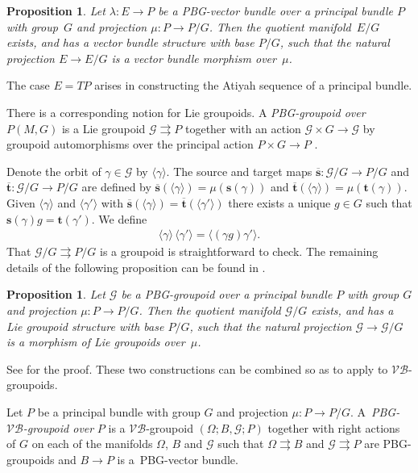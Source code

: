 \documentclass[pdftex]{sigma}
\newcommand{\Ss}{\textbf{s}}
\newcommand{\Tt}{\textbf{t}}
\renewcommand{\to}{\rightarrow}
\newcommand{\gold}{\mscr{G}}
\newcommand{\mscr}[1]{\mathscr{#1}}
\newcommand{\gpd}{\rightrightarrows}
\newcommand{\Om}{\Omega}
\renewcommand{\Bar}[1]{\overline{#1}}
\newcommand{\baralpha}{\Bar{\Ss}}
\newcommand{\barbeta}{\Bar{\Tt}}
\numberwithin{equation}{section}
\newtheorem{Proposition}[Theorem]{Proposition}
 { \theoremstyle{definition}
\newtheorem{Definition}[Theorem]{Definition}
\newtheorem{Example}[Theorem]{Example}
\newtheorem{Remark}[Theorem]{Remark} }
\begin{document}
\begin{Proposition}\label{prop:pbgvb}
Let $\lambda\colon E\to P$ be a PBG-vector bundle over a principal bundle $P$ with group~$G$ and projection $\mu\colon P\to P/G$. Then the quotient manifold~$E/G$ exists, and has a vector bundle structure with base $P/G$, such that the natural projection $E\to E/G$ is a vector bundle morphism over~$\mu$.
\end{Proposition}

The case $E = TP$ arises in constructing the Atiyah sequence of a principal bundle.

There is a corresponding notion for Lie groupoids. A \emph{PBG-groupoid over $P(M,G)$} is a Lie groupoid $\gold\gpd P$ together with an action $\gold\times G\to \gold$ by groupoid automorphisms over the principal action $P\times G\to P$ \cite[ Def\/inition~2.5.4]{Mackenzie:GT}.

Denote the orbit of $\gamma\in \gold$ by $\langle \gamma\rangle$. The source and target maps $\baralpha\colon \gold/G\to P/G$ and $\barbeta\colon \gold/G\to P/G$ are def\/ined by $\baralpha(\langle \gamma\rangle) = \mu(\Ss(\gamma))$ and $\barbeta(\langle \gamma\rangle) = \mu(\Tt(\gamma))$. Given $\langle \gamma\rangle$ and $\langle \gamma'\rangle$ with $\baralpha(\langle \gamma\rangle) = \barbeta(\langle\gamma'\rangle)$ there exists a unique $g\in G$ such that $\Ss(\gamma)g = \Tt(\gamma')$. We def\/ine
\begin{gather*}
\langle \gamma\rangle\,\langle \gamma'\rangle = \langle (\gamma g)\gamma'\rangle.
\end{gather*}
That $\gold/G\gpd P/G$ is a groupoid is straightforward to check. The remaining details of the following proposition can be found in \cite[Section~3.1]{Mackenzie:GT}.
\begin{Proposition}\label{prop:pbggpd}
Let $\gold$ be a PBG-groupoid over a principal bundle $P$ with group $G$ and projection $\mu\colon P\to P/G$. Then the quotient manifold $\gold/G$ exists, and has a Lie groupoid structure with base $P/G$, such that the natural projection $\gold\to \gold/G$ is a morphism of Lie groupoids over~$\mu$.
\end{Proposition}

See \cite[Proposition~2.5.5]{Mackenzie:GT} for the proof. These two constructions can be combined so as to apply to $\mathcal{V}\!\mathcal{B}$-groupoids.

\begin{Definition}\label{defn:PBGVBgpd}
Let $P$ be a principal bundle with group $G$ and projection $\mu\colon P\to P/G$. A~\emph{PBG-$\mathcal{V}\!\mathcal{B}$-groupoid over} $P$ is a $\mathcal{V}\!\mathcal{B}$-groupoid $(\Om;B,\gold;P)$ together with right actions of $G$ on each of the manifolds $\Om$, $B$ and $\gold$ such that $\Om\gpd B$ and $\gold\gpd P$ are PBG-groupoids and $B\to P$ is a~PBG-vector bundle.
\end{Definition}
\end{document}
